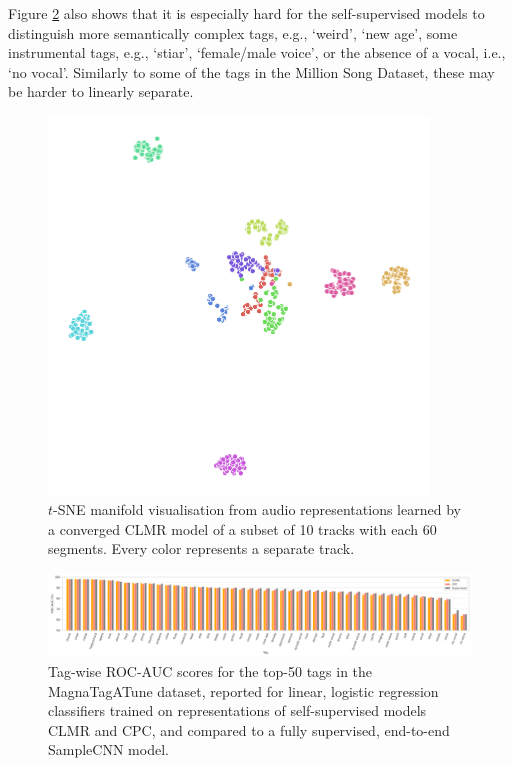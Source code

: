 Figure \ref{fig:tag_scores} also shows that it is especially hard for the self-supervised models to distinguish more semantically complex tags, e.g., `weird', `new age', some instrumental tags, e.g., `stiar', `female/male voice', or the absence of a vocal, i.e., `no vocal'. Similarly to some of the tags in the Million Song Dataset, these may be harder to linearly separate.


\begin{figure}[h]
    \centering
    \includegraphics[width=0.9\textwidth]{figs/tsne-clmr.png}
    \caption{$t$-SNE manifold visualisation from audio representations learned by a converged CLMR model of a subset of 10 tracks with each 60 segments.
Every color represents a separate track.}
    \label{fig:tsne_manifold}
\end{figure}

\begin{figure}[h]
    \centering
    \includegraphics[width=\textwidth]{figs/tag_retrieval.png}
    \caption{Tag-wise ROC-AUC scores for the top-50 tags in the MagnaTagATune dataset, reported for linear, logistic regression classifiers trained on representations of self-supervised models CLMR and CPC, and compared to a fully supervised, end-to-end SampleCNN model.}
    \label{fig:tag_scores}
\end{figure}


